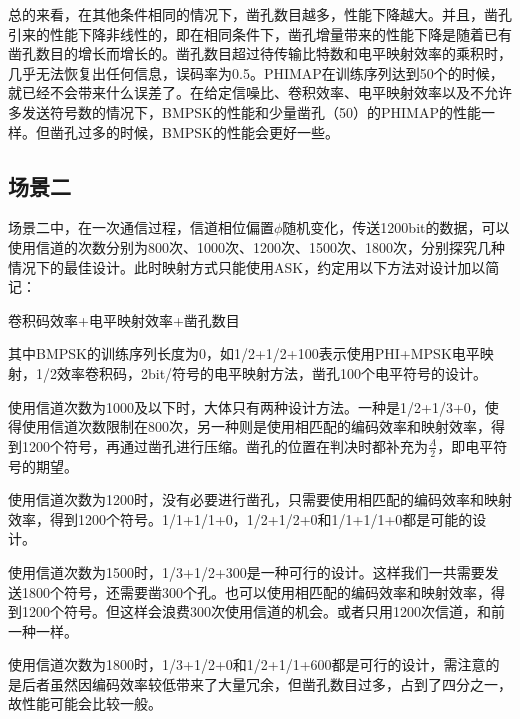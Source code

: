 总的来看，在其他条件相同的情况下，凿孔数目越多，性能下降越大。并且，凿孔引来的性能下降非线性的，即在相同条件下，凿孔增量带来的性能下降是随着已有凿孔数目的增长而增长的。凿孔数目超过待传输比特数和电平映射效率的乘积时，几乎无法恢复出任何信息，误码率为0.5。PHIMAP在训练序列达到50个的时候，就已经不会带来什么误差了。在给定信噪比、卷积效率、电平映射效率以及不允许多发送符号数的情况下，BMPSK的性能和少量凿孔（50）的PHIMAP的性能一样。但凿孔过多的时候，BMPSK的性能会更好一些。

\subsection{场景二}

场景二中，在一次通信过程，信道相位偏置$\phi$随机变化，传送1200bit的数据，可以使用信道的次数分别为800次、1000次、1200次、1500次、1800次，分别探究几种情况下的最佳设计。此时映射方式只能使用ASK，约定用以下方法对设计加以简记：
\begin{center}
卷积码效率+电平映射效率+凿孔数目
\end{center}

其中BMPSK的训练序列长度为0，如1/2+1/2+100表示使用PHI+MPSK电平映射，1/2效率卷积码，2bit/符号的电平映射方法，凿孔100个电平符号的设计。

使用信道次数为1000及以下时，大体只有两种设计方法。一种是1/2+1/3+0，使得使用信道次数限制在800次，另一种则是使用相匹配的编码效率和映射效率，得到1200个符号，再通过凿孔进行压缩。凿孔的位置在判决时都补充为$\frac{A}{2}$，即电平符号的期望。

使用信道次数为1200时，没有必要进行凿孔，只需要使用相匹配的编码效率和映射效率，得到1200个符号。1/1+1/1+0，1/2+1/2+0和1/1+1/1+0都是可能的设计。

使用信道次数为1500时，1/3+1/2+300是一种可行的设计。这样我们一共需要发送1800个符号，还需要凿300个孔。也可以使用相匹配的编码效率和映射效率，得到1200个符号。但这样会浪费300次使用信道的机会。或者只用1200次信道，和前一种一样。
    
使用信道次数为1800时，1/3+1/2+0和1/2+1/1+600都是可行的设计，需注意的是后者虽然因编码效率较低带来了大量冗余，但凿孔数目过多，占到了四分之一，故性能可能会比较一般。

